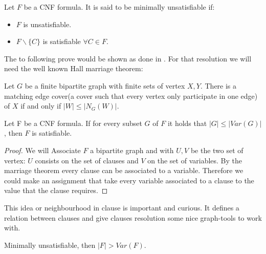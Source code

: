 \begin{definition}
Let $F$ be a CNF formula. It is said to be minimally unsatisfiable if:
\begin{itemize}
	\item $F$ is unsatisfiable.
	\item $F\backslash \{C\}$ is satisfiable $\forall C \in F$.
\end{itemize}
\end{definition}


The to following prove would be shown as done in \cite{schoning2013satisfiability}. For that resolution we will need the well known Hall marriage theorem\cite{hall2009representatives}:

\begin{theorem}
  Let $G$ be a finite bipartite graph with finite sets of vertex $X,Y$. There is a matching edge cover(a cover such that every vertex only participate in one edge) of $X$ if and only if $|W| \le |N_G(W)|$.  
\end{theorem}


\begin{lemma}
Let F be a CNF formula. If for every subset $G$ of $F$ it holds that $|G|\le |Var(G)|$, then $F$ is satisfiable.
\end{lemma}

\begin{proof}
 We will Associate $F$ a bipartite graph and with $U, V$ be the two set of vertex: $U$ consists on the set of clauses and $V$ on the set of variables. By the marriage theorem every clause can be associated to a variable. Therefore we could make an assignment that take every variable associated to a clause to the value that the clause requires.
\end{proof}

This idea or neighbourhood in clause is important and curious. It defines a relation between clauses and give clauses resolution some nice graph-tools to work with.


\begin{proposition}
	Minimally unsatisfiable, then $|F| > Var(F)$.
\end{proposition}

